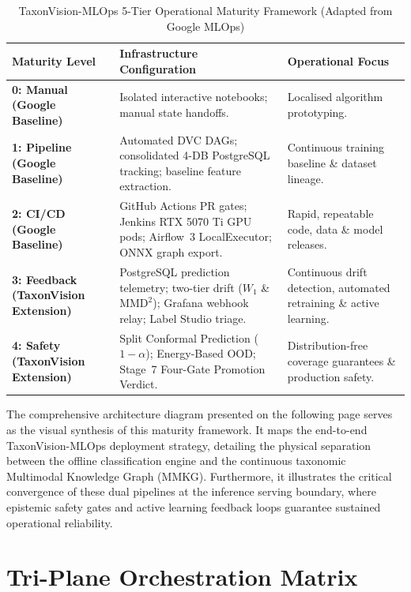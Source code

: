 \begin{table}[htbp]
\centering
\caption{TaxonVision-MLOps 5-Tier Operational Maturity Framework (Adapted from Google MLOps)}
\label{tab:maturity_framework}
\begin{tabularx}{\textwidth}{@{}p{} X X@{}}
\toprule
\textbf{Maturity Level} & \textbf{Infrastructure Configuration} & \textbf{Operational Focus} \\
\midrule
\textbf{0: Manual (Google Baseline)} & Isolated interactive notebooks; manual state handoffs. & Localised algorithm prototyping. \\
\textbf{1: Pipeline (Google Baseline)} & Automated DVC DAGs; consolidated 4-DB PostgreSQL tracking; baseline feature extraction. & Continuous training baseline \& dataset lineage. \\
\textbf{2: CI/CD (Google Baseline)} & GitHub Actions PR gates; Jenkins RTX 5070 Ti GPU pods; Airflow~3 LocalExecutor; ONNX graph export. & Rapid, repeatable code, data \& model releases. \\
\textbf{3: Feedback (TaxonVision Extension)} & PostgreSQL prediction telemetry; two-tier drift ($W_1$ \& $\text{MMD}^2$); Grafana webhook relay; Label Studio triage. & Continuous drift detection, automated retraining \& active learning. \\
\textbf{4: Safety (TaxonVision Extension)} & Split Conformal Prediction ($1-\alpha$); Energy-Based OOD; Stage~7 Four-Gate Promotion Verdict. & Distribution-free coverage guarantees \& production safety. \\
\bottomrule
\end{tabularx}
\end{table}

The comprehensive architecture diagram presented on the following page serves as the visual synthesis of this maturity framework. It maps the end-to-end TaxonVision-MLOps deployment strategy, detailing the physical separation between the offline classification engine and the continuous taxonomic Multimodal Knowledge Graph (MMKG). Furthermore, it illustrates the critical convergence of these dual pipelines at the inference serving boundary, where epistemic safety gates and active learning feedback loops guarantee sustained operational reliability.

\section{Tri-Plane Orchestration Matrix}
\label{sec:tri_plane_orchestration}

